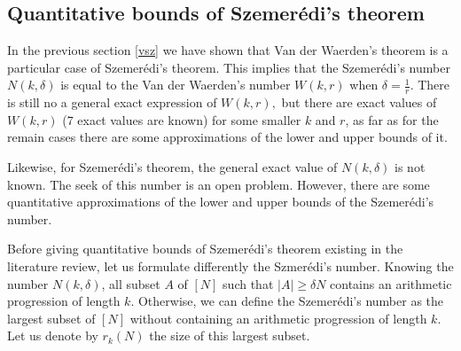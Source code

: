 \subsection{Quantitative bounds of Szemerédi's theorem}

In the previous section \eqref{vsz} we have shown that Van der Waerden's theorem is a particular case of Szemerédi's theorem. This implies that the Szemerédi's number $N(k, \delta)$ is equal to the Van der Waerden's number $W(k,r)$ when $\delta=\frac{1}{r}.$ There is still no a general exact expression of $W(k,r),$ but there are exact values of $W(k,r)$ (7 exact values are known) for some smaller $k$ and $r$, as far as for the remain cases there are some  approximations of the lower and upper bounds of it. 

Likewise, for Szemerédi's theorem, the general exact value of $N(k, \delta)$ is not known. The seek of this number is an open problem. However, there are some quantitative approximations of the lower and upper bounds of the Szemerédi's number.  

Before giving quantitative bounds of Szemerédi's theorem existing in the literature review, let us formulate differently the Szmerédi's number. Knowing the number $N(k, \delta)$, all subset $A$ of $[N]$ such that $|A|\geq \delta N$ contains an arithmetic progression of length $k.$ Otherwise, we can define the Szemerédi's number as the largest subset of $[N]$ without containing an arithmetic progression of length $k.$ Let us denote by $r_k(N)$ the size of this largest subset. 

